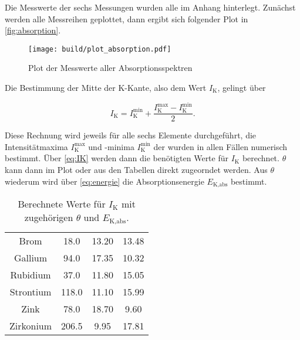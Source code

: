 Die Messwerte der sechs Messungen wurden alle im Anhang hinterlegt.
Zunächst werden alle Messreihen geplottet, dann ergibt sich folgender Plot in \autoref{fig:absorption}.

\begin{figure}
    \centering
    \texttt{[image: build/plot\_absorption.pdf]}
    \caption{Plot der Messwerte aller Absorptionsspektren}
    \label{fig:absorption}
\end{figure}

Die Bestimmung der Mitte der K-Kante, also dem Wert $I_\text{K}$, gelingt über 

\begin{equation}
    I_\text{K} = I^\text{min}_\text{K} + \frac{I^\text{max}_\text{K} - I^\text{min}_\text{K}}{2}.
    \label{eq:IK}
\end{equation}

Diese Rechnung wird jeweils für alle sechs Elemente durchgeführt, die Intensitätmaxima $I^{\text{max}}_\text{K}$ und -minima $I^{\text{min}}_\text{K}$ der  wurden in allen Fällen numerisch bestimmt.
Über \eqref{eq:IK} werden dann die benötigten Werte für $I_\text{K}$ berechnet.
$\theta$ kann dann im Plot oder aus den Tabellen direkt zugeorndet werden.
Aus $\theta$ wiederum wird über \eqref{eq:energie} die Absorptionsenergie $E_\text{K,abs}$ bestimmt.


\begin{table}
    \centering
    \caption{Berechnete Werte für $I_\text{K}$ mit zugehörigen $\theta$ und $E_\text{K,abs}$.}
    \label{tab:IK}
    \begin{tabular}{c S[table-format=3.1] S[table-format=2.2] S[table-format=2.2]}
        \toprule
          &  & \tableSI{\theta}{\degree} & \\
        \midrule
        Brom & 18.0 & 13.20 & 13.48\\
        Gallium & 94.0 & 17.35 & 10.32\\
        Rubidium & 37.0 & 11.80 & 15.05\\
        Strontium & 118.0 & 11.10 & 15.99\\
        Zink & 78.0 & 18.70 & 9.60\\
        Zirkonium & 206.5 & 9.95 & 17.81\\
        \bottomrule
    \end{tabular}
\end{table}

